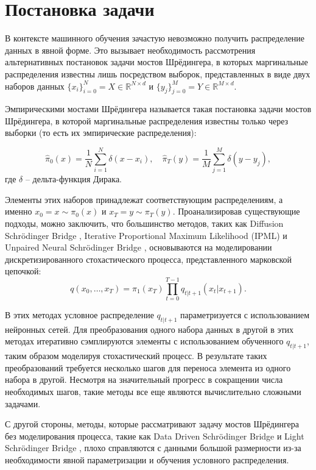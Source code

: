 \section{Постановка задачи}
\label{sec:Chapter2} 

В контексте машинного обучения зачастую невозможно получить распределение данных в явной форме. Это вызывает необходимость рассмотрения альтернативных постановок задачи мостов Шрёдингера, в которых маргинальные распределения известны лишь посредством выборок, представленных в виде двух наборов данных $\{x_i\}_{i=0}^N = X \in \mathbb{R}^{N\times d}$ и $ \{y_j\}_{j=0}^M = Y\in \mathbb{R}^{M\times d}$. 

Эмпирическими мостами Шрёдингера называется такая постановка задачи мостов Шрёдингера, в которой маргинальные распределения известны только через выборки (то есть их эмпирические распределения):

\begin{equation*}
    \hat{\pi}_0(x) = \frac{1}{N} \sum_{i=1}^{N} \delta(x - x_i), \quad \hat{\pi}_T(y) = \frac{1}{M} \sum_{j=1}^{M} \delta(y - y_j),
\end{equation*}
где $\delta$ -- дельта-функция Дирака.

Элементы этих наборов принадлежат соответствующим распределениям, а именно $x_0 = x \sim \pi_0(x)$ и $x_T = y \sim \pi_T(y)$.
Проанализировав существующие подходы, можно заключить, что большинство методов, таких как Diffusion Schrödinger Bridge \cite{dsb}, Iterative Proportional Maximum Likelihood (IPML) \cite{mle-sb} и Unpaired Neural Schrödinger Bridge \cite{cycle-sb}, основываются на моделировании дискретизированного стохастического процесса, представленного марковской цепочкой:
\begin{equation*}
q(x_0, \dots, x_T) = \pi_1(x_T) \prod_{t=0}^{T-1} q_{t|t+1} (x_t | x_{t+1}).
\end{equation*}

В этих методах условное распределение $q_{t|t+1}$ параметризуется с использованием нейронных сетей. Для преобразования одного набора данных в другой в этих методах итеративно сэмплируются элементы с использованием обученного $q_{t|t+1}$, таким образом моделируя стохастический процесс. В результате таких преобразований требуется несколько шагов для переноса элемента из одного набора в другой. Несмотря на значительный прогресс в сокращении числа необходимых шагов, такие методы все еще являются вычислительно сложными задачами.

С другой стороны, методы, которые рассматривают задачу мостов Шрёдингера без моделирования процесса, такие как Data Driven Schrödinger Bridge \cite{pmlr-v139-wang21l} и Light Schrödinger Bridge \cite{lsb}, плохо справляются с данными большой размерности из-за необходимости явной параметризации и обучения условного распределения.

